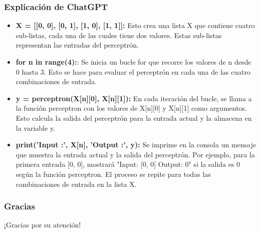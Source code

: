 \documentclass{beamer}
\begin{document}
\begin{frame}
\frametitle{Explicación de ChatGPT}
\begin{itemize}

\item \textbf{X = [[0, 0], [0, 1], [1, 0], [1, 1]]:} Esto crea una lista X que contiene cuatro sub-listas, cada una de las cuales tiene dos valores. Estas sub-listas representan las entradas del perceptrón.

\item \textbf{for n in range(4):}: Se inicia un bucle for que recorre los valores de n desde 0 hasta 3. Esto se hace para evaluar el perceptrón en cada una de las cuatro combinaciones de entrada.

\item \textbf{y = perceptron(X[n][0], X[n][1]):} En cada iteración del bucle, se llama a la función perceptron con los valores de X[n][0] y X[n][1] como argumentos. Esto calcula la salida del perceptrón para la entrada actual y la almacena en la variable y.

\item \textbf{print('Input :', X[n], 'Output :', y):} Se imprime en la consola un mensaje que muestra la entrada actual y la salida del perceptrón. Por ejemplo, para la primera entrada [0, 0], mostrará "Input: [0, 0] Output: 0" si la salida es 0 según la función perceptron. El proceso se repite para todas las combinaciones de entrada en la lista X.

\end{itemize}
\end{frame}



\begin{frame}
\frametitle{Gracias}
\begin{center}
\Huge ¡Gracias por su atención!
\end{center}
\end{frame}
\end{document}
